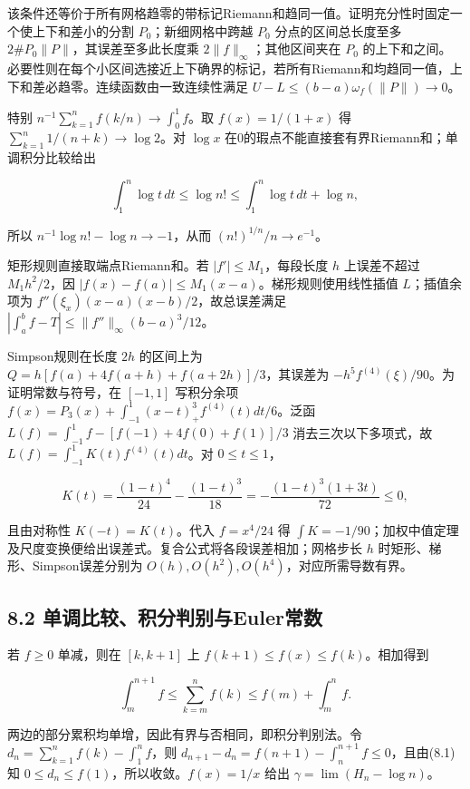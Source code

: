 \documentclass[11pt,a4paper]{article}
\begin{document}
该条件还等价于所有网格趋零的带标记Riemann和趋同一值。证明充分性时固定一个使上下和差小的分割
\(P_0\)；新细网格中跨越 \(P_0\) 分点的区间总长度至多
\(2\#P_0\|P\|\)，其误差至多此长度乘 \(2\|f\|_\infty\)；其他区间夹在
\(P_0\)
的上下和之间。必要性则在每个小区间选接近上下确界的标记，若所有Riemann和均趋同一值，上下和差必趋零。连续函数由一致连续性满足
\(U-L\le(b-a)\omega_f(\|P\|)\to0\)。

特别 \(n^{-1}\sum_{k=1}^nf(k/n)\to\int_0^1f\)。取 \(f(x)=1/(1+x)\) 得
\(\sum_{k=1}^n1/(n+k)\to\log2\)。对 \(\log x\)
在0的瑕点不能直接套有界Riemann和；单调积分比较给出

\[
\int_1^n\log t\,dt\le\log n!\le\int_1^n\log t\,dt+\log n,
\]

所以 \(n^{-1}\log n!-\log n\to-1\)，从而 \((n!)^{1/n}/n\to e^{-1}\)。

矩形规则直接取端点Riemann和。若 \(|f'|\le M_1\)，每段长度 \(h\)
上误差不超过 \(M_1h^2/2\)，因
\(|f(x)-f(a)|\le M_1(x-a)\)。梯形规则使用线性插值 \(L\)；插值余项为
\(f''(\xi_x)(x-a)(x-b)/2\)，故总误差满足
\(|\int_a^bf-T|\le\|f''\|_\infty(b-a)^3/12\)。

Simpson规则在长度 \(2h\) 的区间上为
\(Q=h[f(a)+4f(a+h)+f(a+2h)]/3\)，其误差为
\(-h^5f^{(4)}(\xi)/90\)。为证明常数与符号，在 \([-1,1]\) 写积分余项
\(f(x)=P_3(x)+\int_{-1}^1(x-t)_+^3f^{(4)}(t)dt/6\)。泛函
\(L(f)=\int_{-1}^1f-[f(-1)+4f(0)+f(1)]/3\) 消去三次以下多项式，故
\(L(f)=\int_{-1}^1K(t)f^{(4)}(t)dt\)。对 \(0\le t\le1\)，

\[
K(t)=\frac{(1-t)^4}{24}-\frac{(1-t)^3}{18}
=-\frac{(1-t)^3(1+3t)}{72}\le0,
\]

且由对称性 \(K(-t)=K(t)\)。代入 \(f=x^4/24\) 得
\(\int K=-1/90\)；加权中值定理及尺度变换便给出误差式。复合公式将各段误差相加；网格步长
\(h\) 时矩形、梯形、Simpson误差分别为
\(O(h),O(h^2),O(h^4)\)，对应所需导数有界。

\subsection{8.2
单调比较、积分判别与Euler常数}\label{ux5355ux8c03ux6bd4ux8f83ux79efux5206ux5224ux522bux4e0eeulerux5e38ux6570}

若 \(f\ge0\) 单减，则在 \([k,k+1]\) 上
\(f(k+1)\le f(x)\le f(k)\)。相加得到

\[
\int_m^{n+1}f\le\sum_{k=m}^nf(k)\le f(m)+\int_m^nf.\tag{8.1}
\]

两边的部分累积均单增，因此有界与否相同，即积分判别法。令
\(d_n=\sum_{k=1}^nf(k)-\int_1^nf\)，则
\(d_{n+1}-d_n=f(n+1)-\int_n^{n+1}f\le0\)，且由(8.1)知
\(0\le d_n\le f(1)\)，所以收敛。\(f(x)=1/x\) 给出
\(\gamma=\lim(H_n-\log n)\)。
\end{document}
